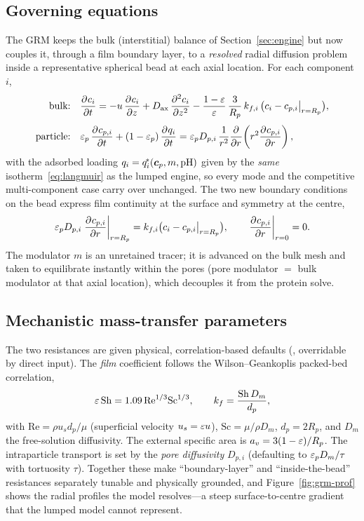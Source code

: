 \subsection{Governing equations}

The GRM keeps the bulk (interstitial) balance of Section~\ref{sec:engine} but now
couples it, through a film boundary layer, to a \emph{resolved} radial diffusion
problem inside a representative spherical bead at each axial location. For each
component $i$,
%
\begin{align}
\text{bulk:}\quad
&\pdv{c_i}{t} = -u\,\pdv{c_i}{z} + D_{\mathrm{ax}}\,\pdv[2]{c_i}{z}
  - \frac{1-\eps}{\eps}\,\frac{3}{R_p}\,k_{f,i}\,
    \bigl(c_i - c_{p,i}\big|_{r=R_p}\bigr),
\label{eq:grm-bulk}\\[0.3em]
\text{particle:}\quad
&\eps_p\,\pdv{c_{p,i}}{t} + (1-\eps_p)\,\pdv{q_i}{t}
  = \eps_p D_{p,i}\,\frac{1}{r^2}\pdv{}{r}\!\left(r^2 \pdv{c_{p,i}}{r}\right),
\label{eq:grm-part}
\end{align}
%
with the adsorbed loading $q_i = \qstar_i(\bm c_p, m, \mathrm{pH})$ given by the
\emph{same} isotherm~\eqref{eq:langmuir} as the lumped engine, so every mode and
the competitive multi-component case carry over unchanged. The two new boundary
conditions on the bead express film continuity at the surface and symmetry at the
centre,
%
\begin{equation}
\eps_p D_{p,i}\left.\pdv{c_{p,i}}{r}\right|_{r=R_p}
  = k_{f,i}\bigl(c_i - c_{p,i}\big|_{r=R_p}\bigr),
\qquad
\left.\pdv{c_{p,i}}{r}\right|_{r=0} = 0.
\label{eq:grm-bc}
\end{equation}
%
The modulator $m$ is an unretained tracer; it is advanced on the bulk mesh and
taken to equilibrate instantly within the pores (pore modulator $=$ bulk
modulator at that axial location), which decouples it from the protein solve.

\subsection{Mechanistic mass-transfer parameters}

The two resistances are given physical, correlation-based defaults
(, overridable by direct input). The \emph{film}
coefficient follows the Wilson--Geankoplis packed-bed correlation,
%
\begin{equation}
\eps\,\mathrm{Sh} = 1.09\,\mathrm{Re}^{1/3}\mathrm{Sc}^{1/3},
\qquad
k_{f} = \frac{\mathrm{Sh}\,D_m}{d_p},
\label{eq:wilson}
\end{equation}
%
with $\mathrm{Re}=\rho u_s d_p/\mu$ (superficial velocity $u_s=\eps u$),
$\mathrm{Sc}=\mu/\rho D_m$, $d_p=2R_p$, and $D_m$ the free-solution diffusivity.
The external specific area is $a_v = 3(1-\eps)/R_p$. The intraparticle transport
is set by the \emph{pore diffusivity} $D_{p,i}$ (defaulting to
$\eps_p D_m/\tau$ with tortuosity $\tau$). Together these make
``boundary-layer'' and ``inside-the-bead'' resistances separately tunable and
physically grounded, and Figure~\ref{fig:grm-prof} shows the radial profiles the
model resolves---a steep surface-to-centre gradient that the lumped model cannot
represent.

